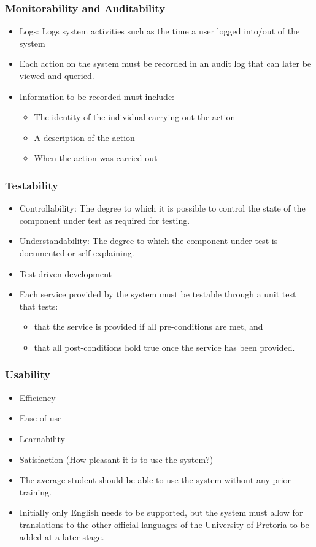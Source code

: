 \documentclass[12pt, oneside]{article}
\begin{document}
		\subsubsection{Monitorability and Auditability}
			\begin{itemize}
				\item Logs: Logs system activities such as the time a user logged into/out of the system
							\item Each action on the system must be recorded in an audit log that can later be viewed and queried.
				\item Information to be recorded must include:
				\begin{itemize}
					\item The identity of the individual carrying out the action
					\item A description of the action
					\item When the action was carried out
				\end{itemize}
			\end{itemize}
		\subsubsection{Testability}
			\begin{itemize}
				\item Controllability: The degree to which it is possible to control the state of the component under test as required for testing.
				\item Understandability: The degree to which the component under test is documented or self-explaining.
				\item Test driven development
				\item Each service provided by the system must be testable through a unit test that tests:
				\begin{itemize}
					\item that the service is provided if all pre-conditions are met, and
					\item that all post-conditions hold true once the service has been provided.
				\end{itemize}
			\end{itemize}
		\subsubsection{Usability}
			\begin{itemize}
				\item Efficiency
				\item Ease of use
				\item Learnability
				\item Satisfaction (How pleasant it is to use the system?)
				\item The average student should be able to use the system without any prior training.
				\item Initially only English needs to be supported, but the system must allow for translations to the other official languages of the University of Pretoria to be added at a later stage.
			\end{itemize}
\end{document}
